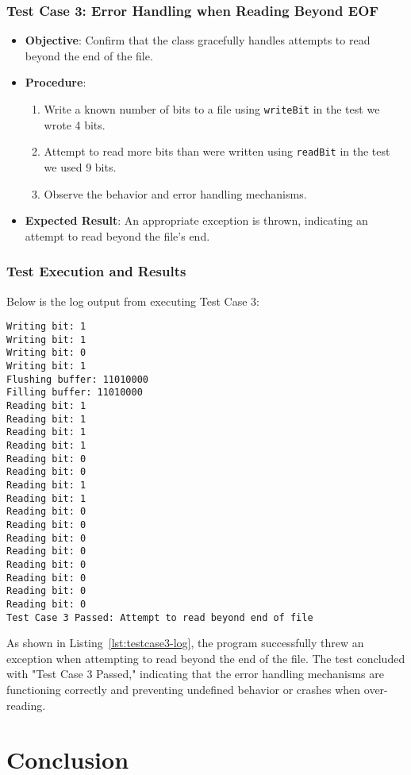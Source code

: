 \documentclass[11pt,twoside,a4paper]{report}
\begin{document}
\subsubsection{Test Case 3: Error Handling when Reading Beyond EOF}
\begin{itemize}
    \item \textbf{Objective}: Confirm that the class gracefully handles attempts to read beyond the end of the file.
    \item \textbf{Procedure}:
    \begin{enumerate}
        \item Write a known number of bits to a file using \texttt{writeBit} in the test we wrote 4 bits.
        \item Attempt to read more bits than were written using \texttt{readBit} in the test we used 9 bits.
        \item Observe the behavior and error handling mechanisms.
    \end{enumerate}
    \item \textbf{Expected Result}: An appropriate exception is thrown, indicating an attempt to read beyond the file's end.
\end{itemize}

\subsubsection{Test Execution and Results}
Below is the log output from executing Test Case 3:

\begin{lstlisting}[style=logstyle, caption={Test Case 3 Execution Log}, label={lst:testcase3-log}]
Writing bit: 1
Writing bit: 1
Writing bit: 0
Writing bit: 1
Flushing buffer: 11010000
Filling buffer: 11010000
Reading bit: 1
Reading bit: 1
Reading bit: 1
Reading bit: 1
Reading bit: 0
Reading bit: 0
Reading bit: 1
Reading bit: 1
Reading bit: 0
Reading bit: 0
Reading bit: 0
Reading bit: 0
Reading bit: 0
Reading bit: 0
Reading bit: 0
Reading bit: 0
Test Case 3 Passed: Attempt to read beyond end of file
\end{lstlisting}

As shown in Listing~\ref{lst:testcase3-log}, the program successfully threw an exception when attempting to read beyond the end of the file. The test concluded with "Test Case 3 Passed," indicating that the error handling mechanisms are functioning correctly and preventing undefined behavior or crashes when over-reading.

\section{Conclusion}
\end{document}
